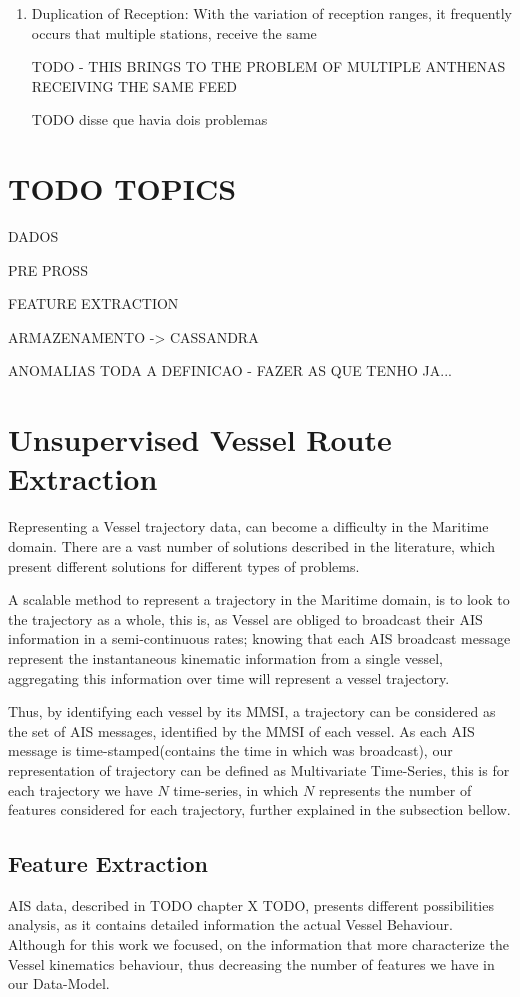 \begin{enumerate}
\item Duplication of Reception:  With the variation of reception ranges, it frequently occurs that multiple stations, receive the same  

TODO - THIS BRINGS TO THE PROBLEM OF MULTIPLE ANTHENAS RECEIVING THE SAME FEED


\item [TODO] disse que havia dois problemas
\end{enumerate}


\section{TODO TOPICS}
DADOS

PRE PROSS

FEATURE EXTRACTION

ARMAZENAMENTO -> CASSANDRA

ANOMALIAS TODA A DEFINICAO 
- FAZER AS QUE TENHO JA...


\section{Unsupervised Vessel Route Extraction}
Representing a Vessel trajectory data, can become a difficulty in the Maritime domain. There are a vast number of solutions described in the literature, which present different solutions for different types of problems. 

A scalable method to represent a trajectory in the Maritime domain, is to look to the trajectory as a whole, this is, as Vessel are obliged to broadcast their AIS information in a semi-continuous rates; knowing that each AIS broadcast message represent the instantaneous kinematic information from a single vessel, aggregating this information over time will represent a vessel trajectory. 

Thus, by identifying each vessel by its MMSI, a trajectory can be considered as the set of AIS messages, identified by the MMSI of each vessel. As each AIS message is time-stamped(contains the time in which was broadcast), our representation of trajectory can be defined as Multivariate Time-Series, this is for each trajectory we have $N$ time-series, in which $N$ represents the number of features considered for each trajectory, further explained in the subsection bellow.

\subsection{Feature Extraction}
AIS data, described in TODO chapter X TODO, presents different possibilities  analysis, as it contains detailed information the actual Vessel Behaviour. Although for this work we focused, on the information that more characterize the Vessel kinematics behaviour, thus decreasing the number of features we have in our Data-Model.



